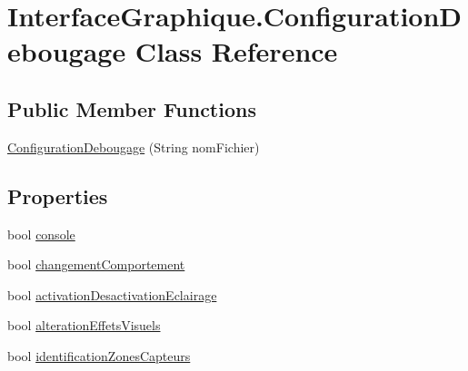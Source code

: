 \hypertarget{class_interface_graphique_1_1_configuration_debougage}{}\section{Interface\+Graphique.\+Configuration\+Debougage Class Reference}
\label{class_interface_graphique_1_1_configuration_debougage}
\subsection*{Public Member Functions}
\begin{DoxyCompactItemize}
\item 
\hyperlink{class_interface_graphique_1_1_configuration_debougage_a20b51799454ae8e5933a9462d72597f5}{Configuration\+Debougage} (String nom\+Fichier)
\end{DoxyCompactItemize}
\subsection*{Properties}
\begin{DoxyCompactItemize}
\item 
bool \hyperlink{class_interface_graphique_1_1_configuration_debougage_a04f2f5464086a4b97fc980e610478796}{console}
\item 
bool \hyperlink{class_interface_graphique_1_1_configuration_debougage_a658c6e3c08fc26996b7e4a213050d13f}{changement\+Comportement}
\item 
bool \hyperlink{class_interface_graphique_1_1_configuration_debougage_ae9abbf86dc968d169b22aa3501211614}{activation\+Desactivation\+Eclairage}
\item 
bool \hyperlink{class_interface_graphique_1_1_configuration_debougage_ada5daa3016fecc8ed3e0c9e1b60cfbbc}{alteration\+Effets\+Visuels}
\item 
bool \hyperlink{class_interface_graphique_1_1_configuration_debougage_aad0771618af1abdaf4ef2fdc0a265403}{identification\+Zones\+Capteurs}
\end{DoxyCompactItemize}


